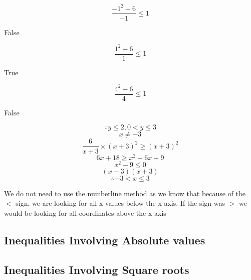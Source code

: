 \documentclass{report}
\begin{document}
$$\frac{-1^{2}-6}{-1} \leq 1$$
\begin{center}
    False
\end{center}
$$\frac{1^{2}-6}{1} \leq 1$$
\begin{center}
    True
\end{center}
$$\frac{4^{2}-6}{4} \leq 1$$
\begin{center}
    False
\end{center}
$$\therefore y \leq 2 , 0<y\leq3$$
$$x \neq -3$$
$$\frac{6}{x+3} \times (x+3)^{2} \geq (x+3)^{2}$$
$$6x+18 \geq x^{2}+6x+9$$
$$x^{2}-9 \leq 0$$
$$(x-3)(x+3)$$
$$\therefore -3 < x \leq 3$$
\begin{note}
    We do not need to use the numberline method as we know that because of the $<$ sign, we are looking for all x values below the x axis.
    \newline 
    If the sign was $>$ we would be looking for all coordinates above the x  axis 
\end{note}














\subsection{Inequalities Involving Absolute values}
\qs{}{\begin{center} \end{center}}
\qs{}{\begin{center} \end{center}}

\subsection{Inequalities Involving Square roots}
\qs{}{\begin{center} \end{center}}
\qs{}{\begin{center} \end{center}}
\end{document}
